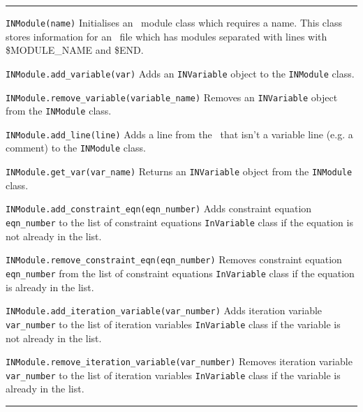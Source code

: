 \rule{\textwidth}{0.4pt}

\begin{description}

\item{\verb|INModule(name)|} Initialises an \indat\ module class which
  requires a name. This class stores information for an \indat\ file which has
  modules separated with lines with \$MODULE\_NAME and \$END.

\item{\verb|INModule.add_variable(var)|} Adds an \verb|INVariable| object to
  the \verb|INModule| class.

\item{\verb|INModule.remove_variable(variable_name)|} Removes an
  \verb|INVariable| object from the \verb|INModule| class.

\item{\verb|INModule.add_line(line)|} Adds a line from the \indat\ that isn't
  a variable line (e.g. a comment) to the \verb|INModule| class.

\item{\verb|INModule.get_var(var_name)|} Returns an \verb|INVariable| object
  from the \verb|INModule| class.

\item{\verb|INModule.add_constraint_eqn(eqn_number)|} Adds constraint
  equation \verb|eqn_number| to the list of constraint equations
  \verb|InVariable| class if the equation is not already in the list.

\item{\verb|INModule.remove_constraint_eqn(eqn_number)|} Removes
  constraint equation \verb|eqn_number| from the list of constraint
  equations \verb|InVariable| class if the equation is already in the list.

\item{\verb|INModule.add_iteration_variable(var_number)|} Adds iteration
  variable \verb|var_number| to the list of iteration variables
  \verb|InVariable| class if the variable is not already in the list.

\item{\verb|INModule.remove_iteration_variable(var_number)|} Removes
  iteration variable \verb|var_number| to the list of iteration variables
  \verb|InVariable| class if the variable is already in the list.

\end{description}

\rule{\textwidth}{0.4pt}


